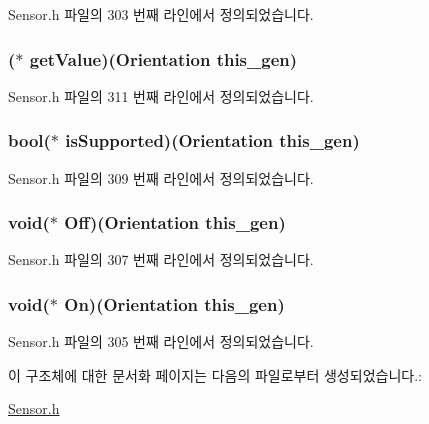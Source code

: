 Sensor.\-h 파일의 303 번째 라인에서 정의되었습니다.

\hypertarget{struct___orientation_abb38457c67d18f412e911e5173d62419}{
\subsubsection[{get\-Value}]{($\ast$  get\-Value)({\bf Orientation} this\-\_\-gen)}}\label{struct___orientation_abb38457c67d18f412e911e5173d62419}


Sensor.\-h 파일의 311 번째 라인에서 정의되었습니다.

\hypertarget{struct___orientation_af272be2847d4987b9107f4f016b573f1}{
\subsubsection[{is\-Supported}]{\setlength{\rightskip}{0pt plus 5cm}bool($\ast$  is\-Supported)({\bf Orientation} this\-\_\-gen)}}\label{struct___orientation_af272be2847d4987b9107f4f016b573f1}


Sensor.\-h 파일의 309 번째 라인에서 정의되었습니다.

\hypertarget{struct___orientation_a104eb416cfdd83daabbc5d9793f0cd05}{
\subsubsection[{Off}]{\setlength{\rightskip}{0pt plus 5cm}void($\ast$  Off)({\bf Orientation} this\-\_\-gen)}}\label{struct___orientation_a104eb416cfdd83daabbc5d9793f0cd05}


Sensor.\-h 파일의 307 번째 라인에서 정의되었습니다.

\hypertarget{struct___orientation_a0848f4dbdfe916967953e71304b5b6f2}{
\subsubsection[{On}]{\setlength{\rightskip}{0pt plus 5cm}void($\ast$  On)({\bf Orientation} this\-\_\-gen)}}\label{struct___orientation_a0848f4dbdfe916967953e71304b5b6f2}


Sensor.\-h 파일의 305 번째 라인에서 정의되었습니다.



이 구조체에 대한 문서화 페이지는 다음의 파일로부터 생성되었습니다.\-:\begin{DoxyCompactItemize}
\item 
\hyperlink{_sensor_8h}{Sensor.\-h}\end{DoxyCompactItemize}
